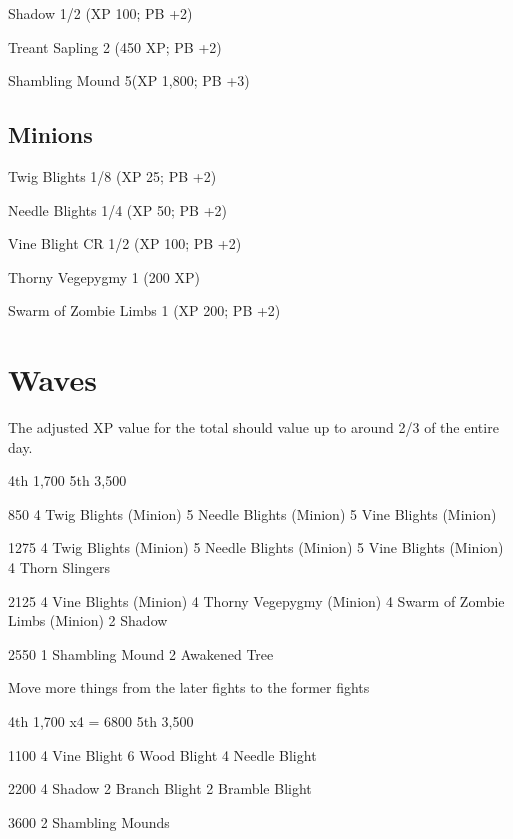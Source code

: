 \documentclass{article}
\begin{document}
    Shadow 1/2 (XP 100; PB +2) 

    Treant Sapling 2 (450 XP; PB +2)

    Shambling Mound 5(XP 1,800; PB +3) 

    \subsection*{Minions}

    Twig Blights 1/8 (XP 25; PB +2) 

    Needle Blights 1/4 (XP 50; PB +2) 

    Vine Blight CR 1/2 (XP 100; PB +2) 

    Thorny Vegepygmy 1 (200 XP)

    Swarm of Zombie Limbs 1 (XP 200; PB +2) 

    \section{Waves}

    The adjusted XP value for the total should value up to around 2/3 of the entire day.

    4th 	1,700
    5th 	3,500

    850 
    4 Twig Blights (Minion)
    5 Needle Blights (Minion)
    5 Vine Blights (Minion)

    1275
    4 Twig Blights (Minion)
    5 Needle Blights (Minion)
    5 Vine Blights (Minion)
    4 Thorn Slingers

    2125
    4 Vine Blights (Minion)
    4 Thorny Vegepygmy (Minion)
    4 Swarm of Zombie Limbs (Minion)
    2 Shadow


    2550
    1 Shambling Mound
    2 Awakened Tree

    Move more things from the later fights to the former fights

    4th 	1,700 x4 = 6800
    5th 	3,500  

    1100
    4 Vine Blight
    6 Wood Blight
    4 Needle Blight

    2200
    4 Shadow
    2 Branch Blight
    2 Bramble Blight

    3600
    2 Shambling Mounds
\end{document}
